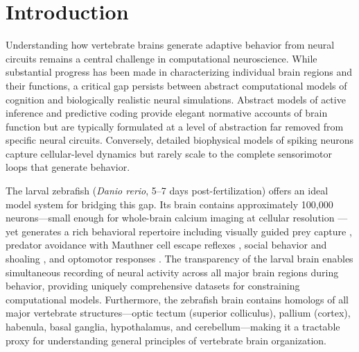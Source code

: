 \documentclass[12pt]{article}
\begin{document}
\begin{abstract}
\medskip
\noindent\textbf{Keywords:} active inference, predictive coding,
spiking neural network, Izhikevich neuron, zebrafish, free energy principle,
neuromodulation, reinforcement learning, virtual organism, excitatory-inhibitory balance
\end{abstract}

\section{Introduction}\label{sec:intro}

Understanding how vertebrate brains generate adaptive behavior from
neural circuits remains a central challenge in computational
neuroscience.
While substantial progress has been made in characterizing individual
brain regions and their functions, a critical gap persists between
abstract computational models of cognition and biologically realistic
neural simulations.
Abstract models of active inference \citep{friston2010,parr2022}
and predictive coding \citep{rao1999,bogacz2017} provide elegant
normative accounts of brain function but are typically formulated at
a level of abstraction far removed from specific neural circuits.
Conversely, detailed biophysical models of spiking neurons capture
cellular-level dynamics but rarely scale to the complete sensorimotor
loops that generate behavior.

The larval zebrafish (\textit{Danio rerio}, 5--7 days
post-fertilization) offers an ideal model system for bridging this
gap.
Its brain contains approximately 100,000 neurons---small enough for
whole-brain calcium imaging at cellular resolution
\citep{ahrens2013}---yet generates a rich behavioral repertoire
including visually guided prey capture \citep{bianco2015}, predator
avoidance with Mauthner cell escape reflexes \citep{temizer2015,dunn2016},
social behavior and shoaling \citep{dreosti2015}, and optomotor
responses \citep{portugues2014}.
The transparency of the larval brain enables simultaneous recording of
neural activity across all major brain regions during behavior, providing
uniquely comprehensive datasets for constraining computational models.
Furthermore, the zebrafish brain contains homologs of all major
vertebrate structures---optic tectum (superior colliculus), pallium
(cortex), habenula, basal ganglia, hypothalamus, and cerebellum---making
it a tractable proxy for understanding general principles of vertebrate
brain organization.
\end{document}
